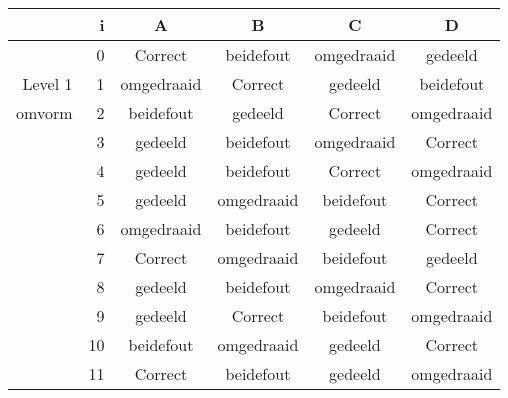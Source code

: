 \begin{tabular}{ rr| c|c|c|c}\hline\hline
     & i & \textbf{A} & \textbf{B} & \textbf{C} & \textbf{D}\\\hline

&0&Correct\cellcolor[gray]{0.6}&beidefout&omgedraaid&gedeeld\\
Level 1 & 1&omgedraaid&Correct\cellcolor[gray]{0.6}&gedeeld&beidefout\\
omvorm &2&beidefout&gedeeld&Correct\cellcolor[gray]{0.6}&omgedraaid\\
&3&gedeeld&beidefout&omgedraaid&Correct\cellcolor[gray]{0.6}\\
&4&gedeeld&beidefout&Correct\cellcolor[gray]{0.6}&omgedraaid\\
&5&gedeeld&omgedraaid&beidefout&Correct\cellcolor[gray]{0.6}\\
&6&omgedraaid&beidefout&gedeeld&Correct\cellcolor[gray]{0.6}\\
&7&Correct\cellcolor[gray]{0.6}&omgedraaid&beidefout&gedeeld\\
&8&gedeeld&beidefout&omgedraaid&Correct\cellcolor[gray]{0.6}\\
&9&gedeeld&Correct\cellcolor[gray]{0.6}&beidefout&omgedraaid\\
&10&beidefout&omgedraaid&gedeeld&Correct\cellcolor[gray]{0.6}\\
&11&Correct\cellcolor[gray]{0.6}&beidefout&gedeeld&omgedraaid\\
\hline\end{tabular}\par\ \newline


